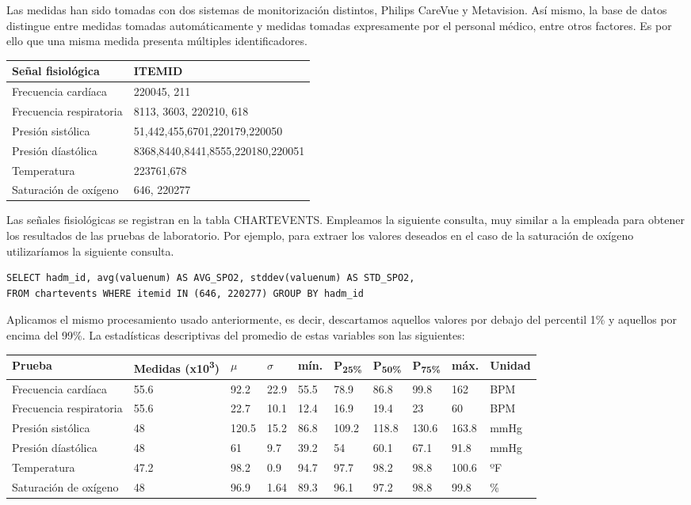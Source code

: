 \documentclass{report}
\begin{document}
Las medidas han sido tomadas con dos sistemas de monitorización
distintos, Philips CareVue y Metavision. Así mismo, la base de datos
distingue entre medidas tomadas automáticamente y medidas tomadas
expresamente por el personal médico, entre otros factores. Es por ello
que una misma medida presenta múltiples identificadores.

\begin{longtable}[]{@{}ll@{}}
\toprule
Señal fisiológica & ITEMID\tabularnewline
\midrule
\endhead
Frecuencia cardíaca & 220045, 211\tabularnewline
Frecuencia respiratoria & 8113, 3603, 220210, 618\tabularnewline
Presión sistólica & 51,442,455,6701,220179,220050\tabularnewline
Presión díastólica & 8368,8440,8441,8555,220180,220051\tabularnewline
Temperatura & 223761,678\tabularnewline
Saturación de oxígeno & 646, 220277\tabularnewline
\bottomrule
\end{longtable}

Las señales fisiológicas se registran en la tabla CHARTEVENTS. Empleamos
la siguiente consulta, muy similar a la empleada para obtener los
resultados de las pruebas de laboratorio. Por ejemplo, para extraer los valores
deseados en el caso de la saturación de oxígeno utilizaríamos la siguiente consulta.

\begin{verbatim}
SELECT hadm_id, avg(valuenum) AS AVG_SPO2, stddev(valuenum) AS STD_SPO2,
FROM chartevents WHERE itemid IN (646, 220277) GROUP BY hadm_id
\end{verbatim}

Aplicamos el mismo procesamiento usado anteriormente, es decir, descartamos aquellos valores por debajo del percentil 1\% y aquellos por encima del 99\%. La estadísticas descriptivas del promedio de estas variables son las siguientes:
\begin{longtable}[]{@{}llllllllll@{}}
\toprule
Prueba  & Medidas (x10\textsuperscript{3}) & $\mu$ &
$\sigma$ & mín. &  P\textsubscript{25\%} & 
 P\textsubscript{50\%} &   P\textsubscript{75\%} & máx. & Unidad \tabularnewline
\midrule
\endhead
Frecuencia cardíaca & 55.6 & 92.2 & 22.9 & 55.5 & 78.9 & 86.8 & 99.8 &
162 & BPM\tabularnewline
Frecuencia respiratoria & 55.6 & 22.7 & 10.1 & 12.4 & 16.9 & 19.4 & 23 &
60 & BPM\tabularnewline
Presión sistólica & 48 & 120.5 & 15.2 & 86.8 & 109.2 & 118.8 & 130.6 &
163.8 & mmHg\tabularnewline
Presión díastólica & 48 & 61 & 9.7 & 39.2 & 54 & 60.1 & 67.1 & 91.8 &
mmHg\tabularnewline
Temperatura & 47.2 & 98.2 & 0.9 & 94.7 & 97.7 & 98.2 & 98.8 & 100.6 &
ºF\tabularnewline
Saturación de oxígeno & 48 & 96.9 & 1.64 & 89.3 & 96.1 & 97.2 & 98.8 &
99.8 & \%\tabularnewline
\bottomrule
\end{longtable}
\end{document}
